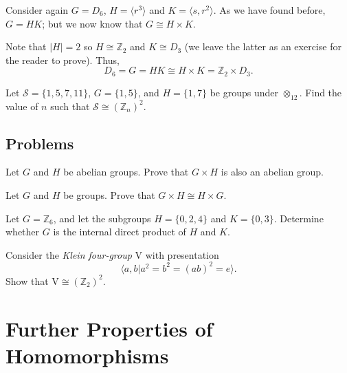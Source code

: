 \begin{example}
    Consider again $G = D_6$, $H = \langle r^3 \rangle$ and $K = \langle s, r^2 \rangle$. As we have found before, $G = HK$; but we now know that $G \cong H \times K$.

    Note that $|H| = 2$ so $H \cong \mathbb{Z}_2$ and $K \cong D_3$ (we leave the latter as an exercise for the reader to prove). Thus,
    \[
        D_6 = G = HK \cong H \times K = \mathbb{Z}_2 \times D_3.
    \]
\end{example}

\begin{exercise}
    Let $\mathcal{S} = \{1, 5, 7, 11\}$, $G = \{1, 5\}$, and $H = \{1, 7\}$ be groups under $\otimes_{12}$. Find the value of $n$ such that $\mathcal{S} \cong (\mathbb{Z}_n)^2$.
\end{exercise}

\newpage

\section{Problems}
\begin{problem}\label{problem-external-direct-product-of-abelian-groups-is-abelian}
    Let $G$ and $H$ be abelian groups. Prove that $G \times H$ is also an abelian group.
\end{problem}

\begin{problem}
    Let $G$ and $H$ be groups. Prove that $G \times H \cong H \times G$.
\end{problem}

\begin{problem}
    Let $G = \mathbb{Z}_6$, and let the subgroups $H = \{0, 2, 4\}$ and $K = \{0, 3\}$. Determine whether $G$ is the internal direct product of $H$ and $K$.
\end{problem}

\begin{problem}
    Consider the \textit{Klein four-group} $\mathrm{V}$ with presentation
    \[
        \langle a, b \vert a^2 = b^2 = (ab)^2 = e \rangle.
    \]
    Show that $\mathrm{V} \cong (\mathbb{Z}_2)^2$.
\end{problem}

\chapter{Further Properties of Homomorphisms}
